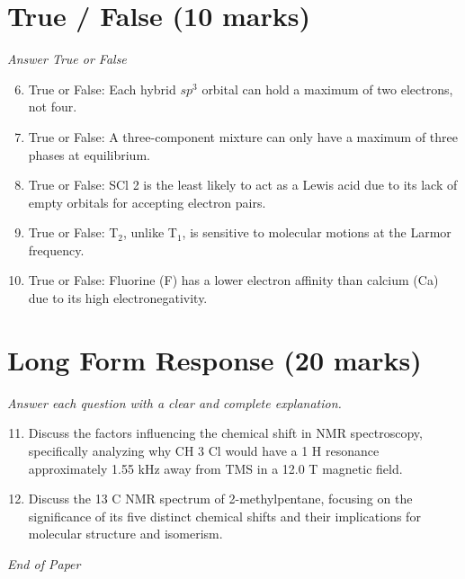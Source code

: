 \documentclass[12pt]{article}
\begin{document}
\section*{True / False (10 marks)}
\textit{Answer True or False}
\begin{enumerate}[label=\arabic*.]
\setcounter{enumi}{5}
\item True or False: Each hybrid $sp^3$ orbital can hold a maximum of two electrons, not four.
\item True or False: A three-component mixture can only have a maximum of three phases at equilibrium.
\item True or False: SCl 2 is the least likely to act as a Lewis acid due to its lack of empty orbitals for accepting electron pairs.
\item True or False: T$_{2}$, unlike T$_{1}$, is sensitive to molecular motions at the Larmor frequency.
\item True or False: Fluorine (F) has a lower electron affinity than calcium (Ca) due to its high electronegativity.
\end{enumerate}

\section*{Long Form Response (20 marks)}
\textit{Answer each question with a clear and complete explanation.}
\begin{enumerate}[label=\arabic*.]
\setcounter{enumi}{10}
\item Discuss the factors influencing the chemical shift in NMR spectroscopy, specifically analyzing why CH 3 Cl would have a 1 H resonance approximately 1.55 kHz away from TMS in a 12.0 T magnetic field.
\item Discuss the 13 C NMR spectrum of 2-methylpentane, focusing on the significance of its five distinct chemical shifts and their implications for molecular structure and isomerism.
\end{enumerate}

\vfill
\noindent\textit{End of Paper}
\end{document}
